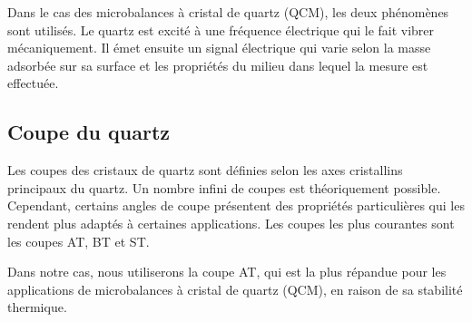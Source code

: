 Dans le cas des microbalances à cristal de quartz (QCM), les deux phénomènes sont utilisés.  
Le quartz est excité à une fréquence électrique qui le fait vibrer mécaniquement.  
Il émet ensuite un signal électrique qui varie selon la masse adsorbée sur sa surface et les propriétés du milieu dans lequel la mesure est effectuée.

\subsection{Coupe du quartz}

Les coupes des cristaux de quartz sont définies selon les axes cristallins principaux du quartz.  
Un nombre infini de coupes est théoriquement possible. Cependant, certains angles de coupe présentent des propriétés particulières qui les rendent plus adaptés à certaines applications.  
Les coupes les plus courantes sont les coupes AT, BT et ST.

Dans notre cas, nous utiliserons la coupe AT, qui est la plus répandue pour les applications de microbalances à cristal de quartz (QCM), en raison de sa stabilité thermique.

